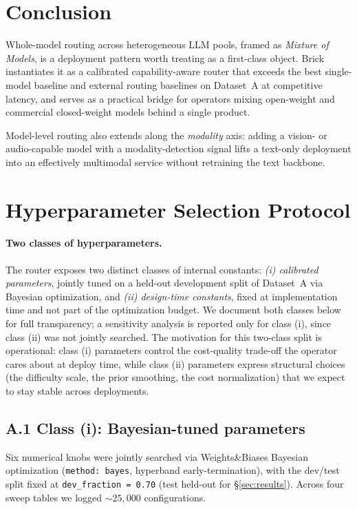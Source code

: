 \documentclass[twocolumn,10pt,a4paper]{article}
\begin{document}
\section{Conclusion}\label{sec:conclusion}
Whole-model routing across heterogeneous LLM pools, framed as \emph{Mixture of Models}, is a deployment pattern worth treating as a first-class object. Brick instantiates it as a calibrated capability-aware router that exceeds the best single-model baseline and external routing baselines on Dataset~A at competitive latency, and serves as a practical bridge for operators mixing open-weight and commercial closed-weight models behind a single product.

Model-level routing also extends along the \emph{modality} axis: adding a vision- or audio-capable model with a modality-detection signal lifts a text-only deployment into an effectively multimodal service without retraining the text backbone.

\appendix
\section{Hyperparameter Selection Protocol}\label{app:hpo}

\paragraph{Two classes of hyperparameters.} The router exposes two distinct classes of internal constants: \emph{(i) calibrated parameters}, jointly tuned on a held-out development split of Dataset~A via Bayesian optimization, and \emph{(ii) design-time constants}, fixed at implementation time and not part of the optimization budget. We document both classes below for full transparency; a sensitivity analysis is reported only for class (i), since class (ii) was not jointly searched. The motivation for this two-class split is operational: class (i) parameters control the cost-quality trade-off the operator cares about at deploy time, while class (ii) parameters express structural choices (the difficulty scale, the prior smoothing, the cost normalization) that we expect to stay stable across deployments.

\subsection*{A.1 Class (i): Bayesian-tuned parameters}
Six numerical knobs were jointly searched via Weights\&Biases Bayesian optimization (\texttt{method: bayes}, hyperband early-termination), with the dev/test split fixed at \texttt{dev\_fraction = 0.70} (test held-out for §\ref{sec:results}). Across four sweep tables we logged $\sim 25{,}000$ configurations.
\end{document}
